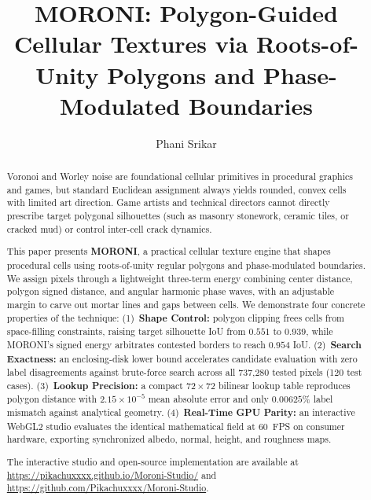 \documentclass[sigconf,nonacm]{acmart}
\begin{document}
\title{MORONI: Polygon-Guided Cellular Textures via Roots-of-Unity Polygons and Phase-Modulated Boundaries}

\author{Phani Srikar}

\begin{abstract}
Voronoi and Worley noise are foundational cellular primitives in procedural graphics and games, but standard Euclidean assignment always yields rounded, convex cells with limited art direction. Game artists and technical directors cannot directly prescribe target polygonal silhouettes (such as masonry stonework, ceramic tiles, or cracked mud) or control inter-cell crack dynamics.

This paper presents \textbf{MORONI}, a practical cellular texture engine that shapes procedural cells using roots-of-unity regular polygons and phase-modulated boundaries. We assign pixels through a lightweight three-term energy combining center distance, polygon signed distance, and angular harmonic phase waves, with an adjustable margin to carve out mortar lines and gaps between cells. We demonstrate four concrete properties of the technique:
(1)~\textbf{Shape Control:} polygon clipping frees cells from space-filling constraints, raising target silhouette IoU from $0.551$ to $0.939$, while MORONI's signed energy arbitrates contested borders to reach $0.954$ IoU.
(2)~\textbf{Search Exactness:} an enclosing-disk lower bound accelerates candidate evaluation with zero label disagreements against brute-force search across all 737,280 tested pixels (120 test cases).
(3)~\textbf{Lookup Precision:} a compact $72\times72$ bilinear lookup table reproduces polygon distance with $2.15\times10^{-5}$ mean absolute error and only $0.00625\%$ label mismatch against analytical geometry.
(4)~\textbf{Real-Time GPU Parity:} an interactive WebGL2 studio evaluates the identical mathematical field at 60~FPS on consumer hardware, exporting synchronized albedo, normal, height, and roughness maps.

The interactive studio and open-source implementation are available at
\url{https://pikachuxxxx.github.io/Moroni-Studio/} and
\url{https://github.com/Pikachuxxxx/Moroni-Studio}.
\end{abstract}

\maketitle
\end{document}
